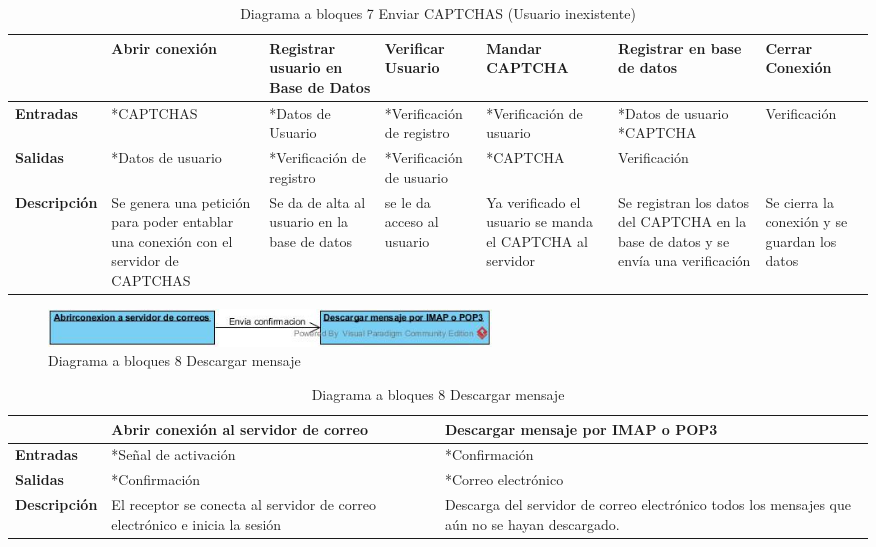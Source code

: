 \documentclass[12pt,oneside,onecolumn,openany]{report}
\begin{document}
\begin{table}[H]
 \centering
   {
     \begin{tabular}{| p{2cm} | p{2cm} | p{} | p{2cm} | p{} | p{} | p{2cm} |}
     \hline
     & \textbf{Abrir conexión} & \textbf{Registrar usuario en Base de Datos} & \textbf{Verificar Usuario} & \textbf{Mandar CAPTCHA} & \textbf{Registrar en base de datos} & \textbf{Cerrar Conexión}\\
     \hline
     \textbf{Entradas} & *CAPTCHAS & *Datos de Usuario & *Verificación de registro & *Verificación de usuario & *Datos de usuario *CAPTCHA & Verificación\\
     \hline
     \textbf{Salidas} & *Datos de usuario & *Verificación de registro & *Verificación de usuario & *CAPTCHA & Verificación &\\
     \hline
     \textbf{Descripción} & Se genera una petición para poder entablar una conexión con el servidor de CAPTCHAS & Se da de alta al usuario en la base de datos & se le da acceso  al usuario & Ya verificado el usuario se manda el CAPTCHA al servidor & Se registran los datos del CAPTCHA en la base de datos y se envía una verificación & Se cierra la conexión y se guardan los datos\\

    \end{tabular}
    }
    \caption{Diagrama a bloques 7 Enviar CAPTCHAS (Usuario inexistente)}
    \label{tabla:b7}
\end{table}
\pagebreak
\begin{figure}[H]
	\includegraphics[width=1\linewidth, height=1cm]{./images/bloques8.jpg}
	\caption{Diagrama a bloques 8 Descargar mensaje}
	\label{fig:5-8-1}
\end{figure}
\begin{table}[H]
 \centering
   {
     \begin{tabular}{| p{3cm} | p{4cm} | p{4cm} |}
     \hline
     & \textbf{Abrir conexión al servidor de correo} & \textbf{Descargar mensaje por IMAP o POP3}\\
     \hline
     \textbf{Entradas} & *Señal de activación & *Confirmación\\
     \hline
     \textbf{Salidas} & *Confirmación & *Correo electrónico\\
     \hline
     \textbf{Descripción} & El receptor se conecta al servidor de correo electrónico e inicia la sesión & Descarga del servidor de correo electrónico todos los mensajes que aún no se hayan descargado.\\

    \end{tabular}
    }
    \caption{Diagrama a bloques 8 Descargar mensaje}
    \label{tabla:b8}
\end{table}
\end{document}
